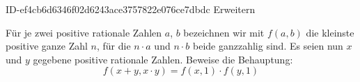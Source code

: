 \begin{exercise}
      {ID-ef4cb6d6346f02d6243ace3757822e076ce7dbdc}
      {Erweitern}
  \ifproblem\problem\par
    Für je zwei positive rationale Zahlen $a$, $b$ bezeichnen wir mit $f(a,b)$
    die kleinste positive ganze Zahl $n$, für die $n\cdot a$ und $n\cdot b$
    beide ganzzahlig sind. Es seien nun $x$ und $y$ gegebene positive rationale
    Zahlen. Beweise die Behauptung:
    \begin{equation*}
      f(x+y,x\cdot y)=f(x,1)\cdot f(y,1)
    \end{equation*}
  \fi
\end{exercise}
